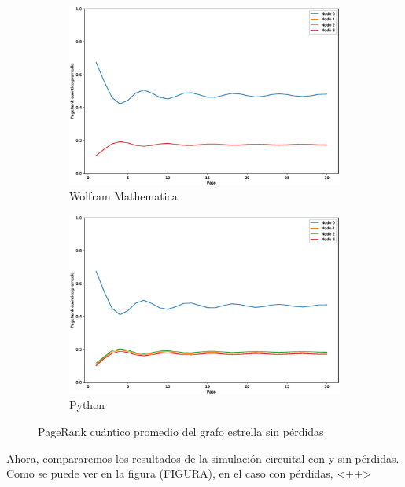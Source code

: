 \begin{figure}[H]
    \centering
    \begin{subfigure}[m]{0.45\textwidth}
        \centering
        \includegraphics[width=0.9\linewidth]{img/star-mean-M.eps}
        \caption{Wolfram Mathematica}
    \end{subfigure}
    \begin{subfigure}[m]{0.45\textwidth}
        \centering
        \includegraphics[width=0.9\linewidth]{img/star-mean-lossless.eps}
        \caption{Python}
    \end{subfigure}
    \caption[PageRank cuántico promedio del grafo estrella sin pérdidas]{PageRank cuántico promedio del grafo estrella sin pérdidas}
    \label{fig:meanstarlossless}
\end{figure}

Ahora, compararemos los resultados de la simulación circuital con y sin pérdidas. Como se puede ver en la figura (FIGURA), en el caso con pérdidas, <++>


